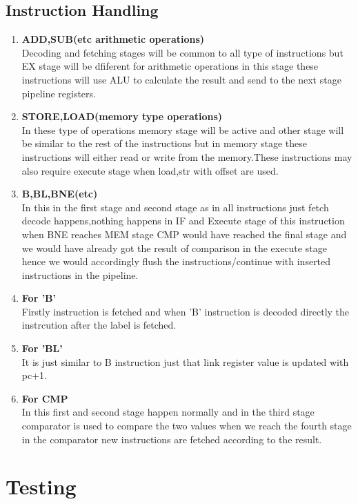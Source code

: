 \documentclass[12pt]{extarticle}
\begin{document}
\subsection{Instruction Handling}
\begin{enumerate}
\item \textbf{ADD,SUB(etc arithmetic operations)}\\ 
Decoding and fetching stages will be common to all type of instructions but EX stage will be dfiferent for arithmetic operations in this stage these instructions will use ALU to calculate the result and send to the next stage pipeline registers.
\item \textbf{STORE,LOAD(memory type operations)}\\ 
In these type of operations memory stage will be active and other stage will be similar to the rest of the instructions but in memory stage these instructions will either read or write from the memory.These instructions may also require execute stage when load,str with offset are used.
\item \textbf{B,BL,BNE(etc)}\\ 
In this in the first stage and second stage as in all instructions just fetch decode happens,nothing happens in IF and Execute stage of this instruction when BNE reaches MEM stage CMP would have reached the final stage and we would have already got the result of comparison in the execute stage hence we would accordingly flush the instructions/continue with inserted instructions in the pipeline.
\item \textbf{For 'B'}\\ 
Firstly instruction is fetched and when 'B' instruction is decoded directly the instrcution after the label is fetched.  
\item \textbf{For 'BL'}\\ 
It is just similar to B instruction just that link register value is updated with pc+1.
\item \textbf{For CMP}\\ 
In this first and second stage happen normally and in the third stage comparator is used to compare the two values when we reach the fourth stage in the comparator new instructions are fetched according to the result. 
\end{enumerate}
\section{Testing}
\end{document}
